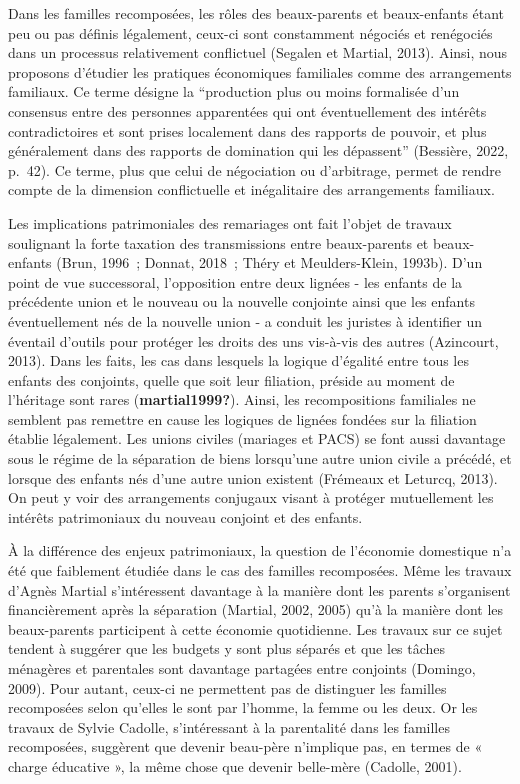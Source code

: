 \documentclass[
  12pt,
]{book}
\begin{document}
Dans les familles recomposées, les rôles des beaux-parents et
beaux-enfants étant peu ou pas définis légalement, ceux-ci sont
constamment négociés et renégociés dans un processus relativement
conflictuel (Segalen et Martial, 2013). Ainsi, nous proposons d'étudier
les pratiques économiques familiales comme des arrangements familiaux.
Ce terme désigne la ``production plus ou moins formalisée d'un consensus
entre des personnes apparentées qui ont éventuellement des intérêts
contradictoires et sont prises localement dans des rapports de pouvoir,
et plus généralement dans des rapports de domination qui les dépassent''
(Bessière, 2022, p.~42). Ce terme, plus que celui de négociation ou
d'arbitrage, permet de rendre compte de la dimension conflictuelle et
inégalitaire des arrangements familiaux.

Les implications patrimoniales des remariages ont fait l'objet de
travaux soulignant la forte taxation des transmissions entre
beaux-parents et beaux-enfants (Brun, 1996~; Donnat, 2018~; Théry et
Meulders-Klein, 1993b). D'un point de vue successoral, l'opposition
entre deux lignées - les enfants de la précédente union et le nouveau ou
la nouvelle conjointe ainsi que les enfants éventuellement nés de la
nouvelle union - a conduit les juristes à identifier un éventail
d'outils pour protéger les droits des uns vis-à-vis des autres
(Azincourt, 2013). Dans les faits, les cas dans lesquels la logique
d'égalité entre tous les enfants des conjoints, quelle que soit leur
filiation, préside au moment de l'héritage sont rares
(\textbf{martial1999?}). Ainsi, les recompositions familiales ne
semblent pas remettre en cause les logiques de lignées fondées sur la
filiation établie légalement. Les unions civiles (mariages et PACS) se
font aussi davantage sous le régime de la séparation de biens lorsqu'une
autre union civile a précédé, et lorsque des enfants nés d'une autre
union existent (Frémeaux et Leturcq, 2013). On peut y voir des
arrangements conjugaux visant à protéger mutuellement les intérêts
patrimoniaux du nouveau conjoint et des enfants.

À la différence des enjeux patrimoniaux, la question de l'économie
domestique n'a été que faiblement étudiée dans le cas des familles
recomposées. Même les travaux d'Agnès Martial s'intéressent davantage à
la manière dont les parents s'organisent financièrement après la
séparation (Martial, 2002, 2005) qu'à la manière dont les beaux-parents
participent à cette économie quotidienne. Les travaux sur ce sujet
tendent à suggérer que les budgets y sont plus séparés et que les tâches
ménagères et parentales sont davantage partagées entre conjoints
(Domingo, 2009). Pour autant, ceux-ci ne permettent pas de distinguer
les familles recomposées selon qu'elles le sont par l'homme, la femme ou
les deux. Or les travaux de Sylvie Cadolle, s'intéressant à la
parentalité dans les familles recomposées, suggèrent que devenir
beau-père n'implique pas, en termes de « charge éducative », la même
chose que devenir belle-mère (Cadolle, 2001).
\end{document}
